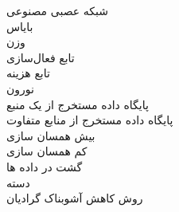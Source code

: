 \begin{RTL}
					شبکه عصبی مصنوعی \dotfill {} \\
					بایاس \dotfill {} \\
					وزن \dotfill {} \\
					تابع فعال‌سازی \dotfill {} \\
					تابع هزینه \dotfill {} \\
					نورون \dotfill {} \\
					پایگاه داده مستخرج از یک منبع \dotfill {} \\
					پایگاه داده مستخرج از منابع متفاوت \dotfill {} \\
					بیش همسان سازی \dotfill {} \\
					کم همسان سازی \dotfill {} \\
					گشت در داده ها \dotfill {} \\
					دسته \dotfill {} \\
					روش کاهش آشوبناک گرادیان \dotfill {} \\
					
							
\end{RTL}